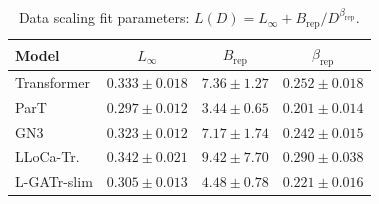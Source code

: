 \begin{table}[ht]
\centering
\caption{Data scaling fit parameters: $L(D) = L_\infty + B_{\mathrm{rep}}/D^{\beta_{\mathrm{rep}}}$.}
\label{tab:data_scaling_fits}
\begin{tabular}{l c c c}
\toprule
Model & $L_\infty$ & $B_{\mathrm{rep}}$ & $\beta_{\mathrm{rep}}$ \\
\midrule
Transformer & $0.333 \pm 0.018$ & $7.36 \pm 1.27$ & $0.252 \pm 0.018$ \\
ParT & $0.297 \pm 0.012$ & $3.44 \pm 0.65$ & $0.201 \pm 0.014$ \\
GN3 & $0.323 \pm 0.012$ & $7.17 \pm 1.74$ & $0.242 \pm 0.015$ \\
LLoCa-Tr. & $0.342 \pm 0.021$ & $9.42 \pm 7.70$ & $0.290 \pm 0.038$ \\
L-GATr-slim & $0.305 \pm 0.013$ & $4.48 \pm 0.78$ & $0.221 \pm 0.016$ \\
\bottomrule
\end{tabular}
\end{table}
